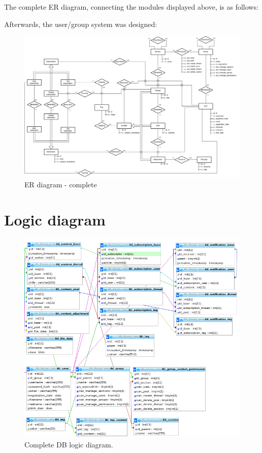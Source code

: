 \documentclass[12pt]{report}
\begin{document}
                The complete ER diagram, connecting the modules displayed above, is as follows:

                Afterwards, the user/group system was designed:

                \begin{figure}[H]
                \caption{ER diagram - complete}
                \centering
                \includegraphics[width=1\textwidth]{ernew/full}
                \end{figure}


                \newpage
            \section{Logic diagram}

                \begin{figure}[!htb]
                \caption{Complete DB logic diagram.}
                \centering
                \includegraphics[width=1\textwidth]{logics}
                \end{figure}
                
\end{document}
